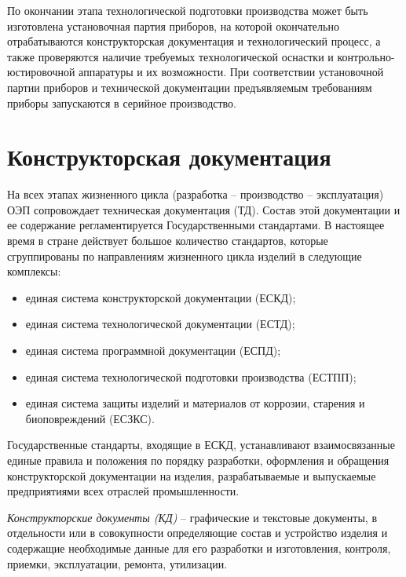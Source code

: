 По окончании этапа технологической подготовки производства может быть изготовлена установочная партия приборов, на которой окончательно отрабатываются конструкторская документация и технологический процесс, а также проверяются наличие требуемых технологической оснастки и контрольно-юстировочной аппаратуры и их возможности. При соответствии установочной партии приборов и технической документации предъявляемым требованиям приборы запускаются в серийное производство.

\section{Конструкторская документация}
На всех этапах жизненного цикла (разработка -- производство -- эксплуатация) ОЭП сопровождает техническая документация (ТД). Состав этой документации и ее содержание регламентируется Государственными стандартами. В настоящее время в стране действует большое количество стандартов, которые сгруппированы по направлениям жизненного цикла изделий в следующие комплексы:
\begin{itemize}
	\item единая система конструкторской документации (ЕСКД);
	\item единая система технологической документации (ЕСТД);
	\item единая система программной документации (ЕСПД);
	\item единая система технологической подготовки производства (ЕСТПП);
	\item единая система защиты изделий и материалов от коррозии, старения и биоповреждений (ЕСЗКС).
\end{itemize}

Государственные стандарты, входящие в ЕСКД, устанавливают взаимосвязанные единые правила и положения по порядку разработки, оформления и обращения конструкторской документации на изделия, разрабатываемые и выпускаемые предприятиями всех отраслей промышленности.

\textit{Конструкторские документы (КД)} -- графические и текстовые документы, в отдельности или в совокупности определяющие состав и устройство изделия и содержащие необходимые данные для его разработки и изготовления, контроля, приемки, эксплуатации, ремонта, утилизации.

